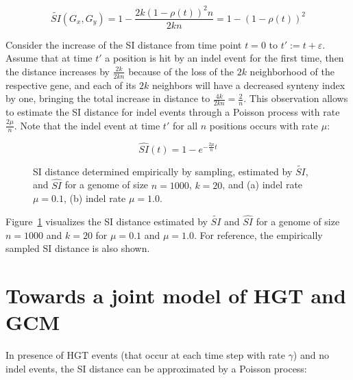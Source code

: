 \documentclass[9pt,english,utf8]{article}
\begin{document}
\begin{equation}
    \widetilde{SI}(G_x, G_y) = 1-\frac{2k(1-\rho(t))^2n}{2kn} = 1-(1-\rho(t))^2
\end{equation}

Consider the increase of the SI distance from time point $t=0$ to $t' :=
t+\varepsilon$. Assume that at time $t'$ a position is hit by an indel event for
the first time, then the distance increases by $\frac{2k}{2kn}$ because of the
loss of the $2k$ neighborhood of the respective gene, and each of its $2k$
neighbors will have a decreased synteny index by one, bringing the total
increase in distance to $\frac{4k}{2kn} = \frac{2}{n}$.  This observation allows
to estimate the SI distance for indel events through a Poisson process with rate
$\frac{2\mu}{n}$. Note that the indel event at time $t'$ for all $n$ positions
occurs with rate $\mu$:

\begin{equation}
    \widehat{SI}(t) = 1-e^{-\frac{2\mu}{n}t}
\end{equation}



\begin{figure}[tb]
    \centering 
    \caption{SI distance determined empirically by sampling, estimated by
    $\widetilde{SI}$, and $\widehat{SI}$ for a genome of size $n=1000$, $k=20$,
    and (a) indel rate $\mu=0.1$, (b) indel rate $\mu=1.0$. }
    \label{fig:si_distance_hgtonly}
\end{figure}

Figure~\ref{fig:si_distance_hgtonly} visualizes the SI distance estimated by
$\widetilde{SI}$ and $\widehat{SI}$ for a genome of size $n=1000$ and $k=20$ for
$\mu = 0.1$ and $\mu = 1.0$. For reference, the empirically sampled SI distance
is also shown. 

\section{Towards a joint model of HGT and GCM}

In presence of HGT events (that occur at each time step with rate $\gamma$) and
no indel events, the SI distance can be approximated by a Poisson process:
\end{document}
